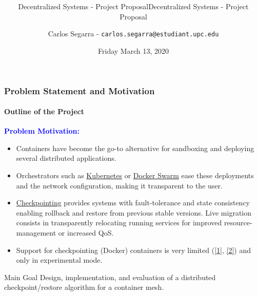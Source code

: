 \documentclass[10pt,    %
    english,            %
    xcolor=table,       %
    envcountsect,        %
    aspectratio=169     %
]{beamer}
\subtitle{Decentralized Systems - Project Proposal} %
\title[\mainTitle] %
    {\Large \mainTitle \\ \normalsize \secondTitle}
\subtitle{Decentralized Systems - Project Proposal} %
\date[March 13, 2020] %
    {Friday March 13, 2020}
\author[] %
{Carlos Segarra - \texttt{carlos.segarra@estudiant.upc.edu}}
\begin{document}
\begin{frame}
  \titlepage
\end{frame}

\begin{frame}
    \frametitle{Problem Statement and Motivation}
    \framesubtitle{Outline of the Project}

    \vspace{-25pt}

    \textbf{\textcolor{blue}{Problem Motivation:}}
    \begin{itemize}
        \small
        \item Containers have become the go-to alternative for sandboxing and deploying several distributed applications. 
        \item Orchestrators such as \href{https://kubernetes.io/}{Kubernetes} or \href{https://docs.docker.com/engine/swarm/}{Docker Swarm} ease these deployments and the network configuration, making it transparent to the user.
        \item \href{https://en.wikipedia.org/wiki/Application_checkpointing}{Checkpointing} provides systems with fault-tolerance and state consistency enabling rollback and restore from previous stable versions.
            Live migration consists in transparently relocating running services for improved resource-management or increased QoS.
        \item Support for checkpointing (Docker) containers is very limited (\href{https://github.com/docker/cli/blob/master/experimental/checkpoint-restore.md}{[1]}, \href{https://criu.org/Docker}{[2]}) and only in experimental mode. 
    \end{itemize}

    \small
    \begin{alertblock}{Main Goal}
        Design, implementation, and evaluation of a distributed checkpoint/restore algorithm for a container mesh.
    \end{alertblock}

\end{frame}
\end{document}
